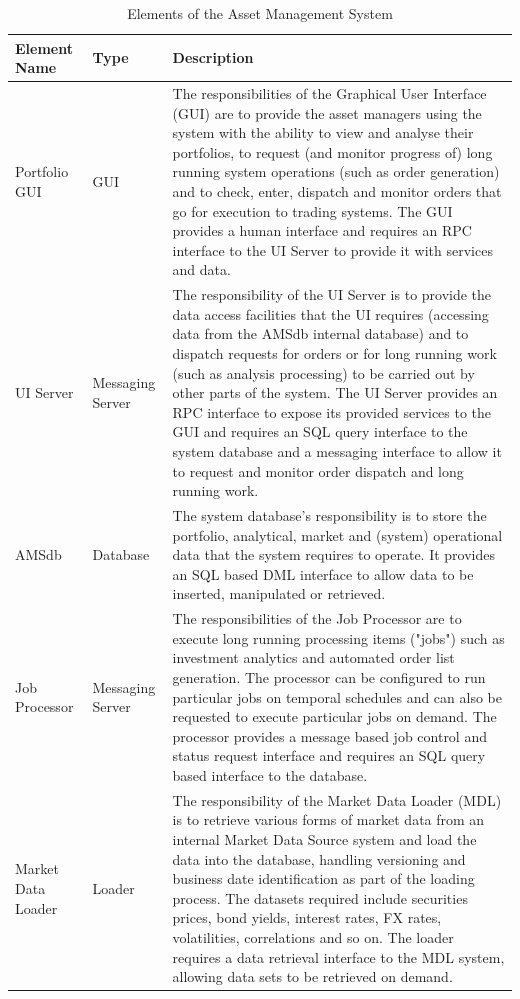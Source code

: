\begin{table}
\caption{Elements of the Asset Management System}
\label{table:amselements}
\footnotesize
\begin{tabular}{| l l p{7cm} |}
\hline
Element Name & Type & Description \\
\hline

Portfolio GUI      & GUI              & The responsibilities of the Graphical User Interface (GUI) are to provide the asset managers using the system with the ability to view and analyse their portfolios, to request (and monitor progress of) long running system operations (such as order generation) and to check, enter, dispatch and monitor orders that go for execution to trading systems.  The GUI provides a human interface and requires an RPC interface to the UI Server to provide it with services and data. \\

UI Server          & Messaging Server & The responsibility of the UI Server is to provide the data access facilities that the UI requires (accessing data from the AMSdb internal database) and to dispatch requests for orders or for long running work (such as analysis processing) to be carried out by other parts of the system.  The UI Server provides an RPC interface to expose its provided services to the GUI and requires an SQL query interface to the system database and a messaging interface to allow it to request and monitor order dispatch and long running work. \\

AMSdb              & Database         & The system database's responsibility is to store the portfolio, analytical, market and (system) operational data that the system requires to operate.  It provides an SQL based DML interface to allow data to be inserted, manipulated or retrieved. \\

Job Processor      & Messaging Server & The responsibilities of the Job Processor are to execute long running processing items ("jobs") such as investment analytics and automated order list generation.  The processor can be configured to run particular jobs on temporal schedules and can also be requested to execute particular jobs on demand.  The processor provides a message based job control and status request interface and requires an SQL query based interface to the database. \\

Market Data Loader & Loader           & The responsibility of the Market Data Loader (MDL) is to retrieve various forms of market data from an internal Market Data Source system and load the data into the database, handling versioning and business date identification as part of the loading process.  The datasets required include securities prices, bond yields, interest rates, FX rates, volatilities, correlations and so on.  The loader requires a data retrieval interface to the MDL system, allowing data sets to be retrieved on demand. \\


\end{tabular}
\end{table}
